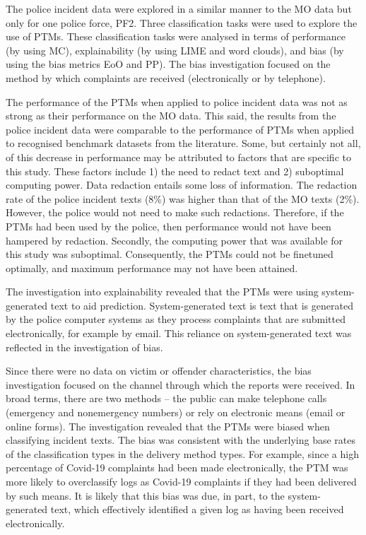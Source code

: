 The police incident data were explored in a similar manner to the MO data but only for one police force, PF2. Three classification tasks were used to explore the use of PTMs. These classification tasks were analysed in terms of performance (by using MC), explainability (by using LIME and word clouds), and bias (by using the bias metrics EoO and PP). The bias investigation focused on the method by which complaints are received (electronically or by telephone).

The performance of the PTMs when applied to police incident data was not as strong as their performance on the MO data. This said, the results from the police incident data were comparable to the performance of PTMs when applied to recognised benchmark datasets from the literature. Some, but certainly not all, of this decrease in performance may be attributed to factors that are specific to this study. These factors include 1) the need to redact text and 2) suboptimal computing power. Data redaction entails some loss of information. The redaction rate of the police incident texts (8\%) was higher than that of the MO texts (2\%). However, the police would not need to make such redactions. Therefore, if the PTMs had been used by the police, then performance would not have been hampered by redaction. Secondly, the computing power that was available for this study was suboptimal. Consequently, the PTMs could not be finetuned optimally, and maximum performance may not have been attained.

The investigation into explainability revealed that the PTMs were using system-generated text to aid prediction. System-generated text is text that is generated by the police computer systems as they process complaints that are submitted electronically, for example by email. This reliance on system-generated text was reflected in the investigation of bias.

Since there were no data on victim or offender characteristics, the bias investigation focused on the channel through which the reports were received. In broad terms, there are two methods – the public can make telephone calls (emergency and nonemergency numbers) or rely on electronic means (email or online forms). The investigation revealed that the PTMs were biased when classifying incident texts. The bias was consistent with the underlying base rates of the classification types in the delivery method types. For example, since a high percentage of Covid-19 complaints had been made electronically, the PTM was more likely to overclassify logs as Covid-19 complaints if they had been delivered by such means. It is likely that this bias was due, in part, to the system-generated text, which effectively identified a given log as having been received electronically.

